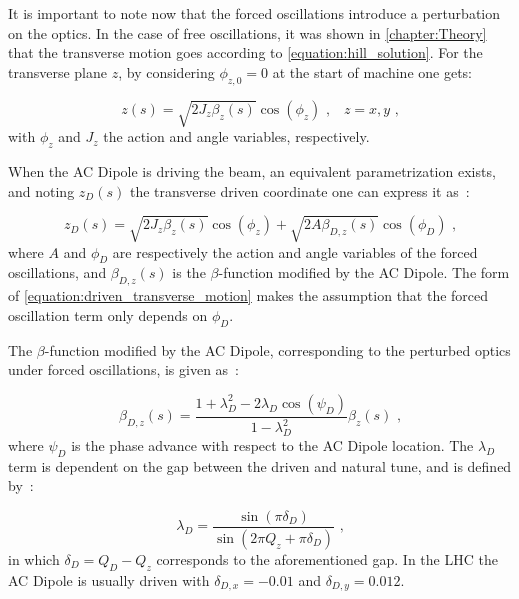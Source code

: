 It is important to note now that the forced oscillations introduce a perturbation on the optics.
In the case of free oscillations, it was shown in \cref{chapter:Theory} that the transverse motion goes according to \cref{equation:hill_solution}.
For the transverse plane \(z\), by considering \(\phi_{z,0} = 0\) at the start of machine one gets:

\begin{equation}
  z(s) = \sqrt{2 J_z \beta_z(s)} \cos \left( \phi_z \right)  \text{ ,} \quad z = x, y \text{ ,}
\end{equation}
with \(\phi_z\) and \(J_z\) the action and angle variables, respectively.

When the AC Dipole is driving the beam, an equivalent parametrization exists, and noting \(z_D(s)\) the transverse driven coordinate one can express it as~\cite{PHD:Miyamoto,PRAB:Tomas:Normal_Form_Particle_Motion_AC_Dipole}:

\begin{equation}
  z_D(s)=\sqrt{2 J_z \beta_z(s)} \cos \left( \phi_z \right) + \sqrt{2 A \beta_{D,z}(s)} \cos \left( \phi_D \right) \text{ ,}
  \label{equation:driven_transverse_motion}
\end{equation}
where \(A\) and \(\phi_D\) are respectively the action and angle variables of the forced oscillations, and \(\beta_{D,z}(s)\) is the \(\beta\)-function modified by the AC Dipole.
The form of \cref{equation:driven_transverse_motion} makes the assumption that the forced oscillation term only depends on \(\phi_D\).

The \(\beta\)-function modified by the AC Dipole, corresponding to the perturbed optics under forced oscillations, is given as~\cite{PRAB:Miyamoto:Parametrization_Driven_Betatron_Oscillation}:

\begin{equation}
  \beta_{D,z}(s) = \frac{1 + \lambda_D^2 - 2 \lambda_D \cos \left(\psi_D\right)}{1 - \lambda_D^2} \beta_z(s) \text{ ,}
  \label{equation:driven_beta_function}
\end{equation}
where \(\psi_D\) is the phase advance with respect to the AC Dipole location.%
The \(\lambda_D\) term is dependent on the gap between the driven and natural tune, and is defined by~\cite{PRAB:Miyamoto:Parametrization_Driven_Betatron_Oscillation}:

\begin{equation}
  \lambda_D = \frac{\sin \left(\pi \delta_D \right)}{\sin \left(2 \pi Q_z + \pi \delta_D \right)} \text{ ,}
  \label{equation:driven_oscillations_lambda_D}
\end{equation}
in which \(\delta_D = Q_D - Q_z\) corresponds to the aforementioned gap.
In the LHC the AC Dipole is usually driven with \(\delta_{D,x} = -0.01\) and \(\delta_{D,y} = 0.012\).

